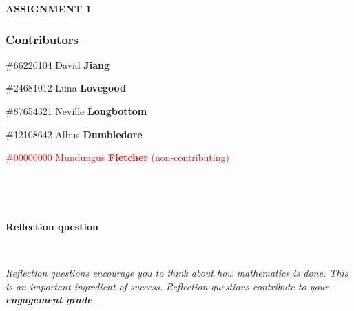 \documentclass{exam}
\begin{document}
\large{\textbf{ASSIGNMENT 1}}

\normalsize




\subsubsection*{Contributors}


\begin{itemize}
    \item \#66220104 David {\bf Jiang} 
    \item \#24681012 Luna {\bf Lovegood}
    \item \#87654321 Neville {\bf Longbottom}
    \item \#12108642 Albus {\bf Dumbledore}
    \textcolor{red}{\item \#00000000 Mundungus {\bf Fletcher}  (non-contributing)}
\end{itemize}

\

\hrulefill

\

\textbf{Reflection question}

\

\textit{Reflection questions encourage you to think about how mathematics is done. This is an important ingredient of success. Reflection questions contribute to your \textbf{engagement grade}.}
\end{document}
